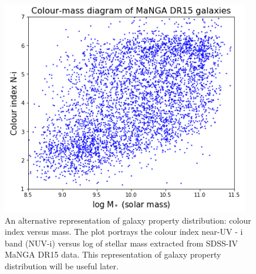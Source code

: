 \begin{figure}
    \centering
    \includegraphics[width=\columnwidth]{images/CMDs/CMD-mass-1.png}
    \caption{An alternative representation of galaxy property distribution: colour index versus mass. The plot portrays the colour index near-UV - i band (NUV-i) versus log of stellar mass extracted from SDSS-IV MaNGA DR15 data. This representation of galaxy property distribution will be useful later.}
    \label{fig:CMD-mass-1}
\end{figure}

